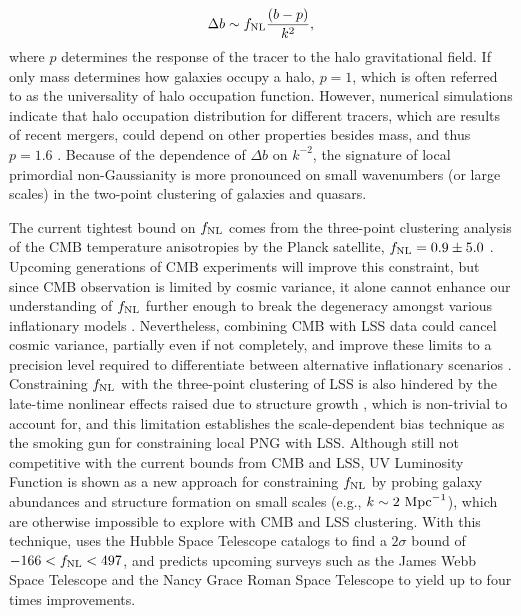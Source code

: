 \begin{equation}\label{eq:db}
\Delta b \sim f_{\rm NL} \frac{(b - p)}{k^{2}},
\end{equation}
where $p$ determines the response of the tracer to the halo gravitational field. If only mass determines how galaxies occupy a halo, $p=1$, which is often referred to as the universality of halo occupation function. However, numerical simulations indicate that halo occupation distribution for different tracers, which are results of recent mergers, could depend on other properties besides mass, and thus $p=1.6$ \citep{slosar2008constraints}. Because of the dependence of $\Delta b$ on $k^{-2}$, the signature of local primordial non-Gaussianity is more pronounced on small wavenumbers (or large scales) in the two-point clustering of galaxies and quasars. 

The current tightest bound on $f_{\rm NL}$ comes from the three-point clustering analysis of the CMB temperature anisotropies by the Planck satellite, $f_{\rm NL}=0.9\pm 5.0$ \citep{akrami2019planck}. Upcoming generations of CMB experiments will improve this constraint, but since CMB observation is limited by cosmic variance, it alone cannot enhance our understanding of $f_{\rm NL}$ further enough to break the degeneracy amongst various inflationary models \citep[see, e.g.,][]{ade2019simons}. Nevertheless, combining CMB with LSS data could cancel cosmic variance, partially even if not completely, and improve these limits to a precision level required to differentiate between alternative inflationary scenarios \citep[see, e.g.,][]{schmittfull2018PhRvD}. Constraining $f_{\rm NL}$ with the three-point clustering of LSS is also hindered by the late-time nonlinear effects raised due to structure growth \citep{baldauf2011galaxy, baldauf2011primordial}, which is non-trivial to account for, and this limitation establishes the scale-dependent bias technique as the smoking gun for constraining local PNG with LSS. Although still not competitive with the current bounds from CMB and LSS, UV Luminosity Function is shown as a new approach for constraining $f_{\rm NL}$ by probing galaxy abundances and structure formation on small scales (e.g., $k \sim 2~{\rm Mpc}^{-1}$), which are otherwise impossible to explore with CMB and LSS clustering. With this technique, \cite{sabti2021JCAP} uses the Hubble Space Telescope catalogs \citep{bouwens2015ApJ} to find a $2\sigma$ bound of $-166<f_{\rm NL}<497$, and predicts upcoming surveys such as the James Webb Space Telescope and the Nancy Grace Roman Space Telescope to yield up to four times improvements.

